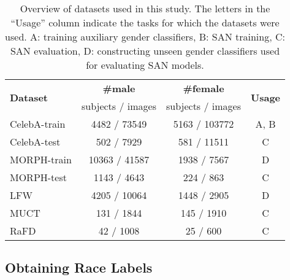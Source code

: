 \documentclass[10pt,twocolumn,letterpaper]{article}
\begin{document}
\begin{table}[h]
\begin{center}
\begin{threeparttable}
\caption{Overview of datasets used in this study. The letters in the ``Usage'' column indicate the tasks for which the datasets were used. A: training auxiliary gender classifiers, B: SAN training, C: SAN evaluation, D: constructing unseen gender classifiers used for evaluating SAN models.}
\label{tab:datasets}
\centering
\small
\begin{tabular}{ l c c c}
 \toprule
 \multirow{2}{*}{ {\bf Dataset} } & {\bf \#male}& {\bf \#female}&   \multirow{2}{*}{ {\bf Usage} } \\
& {subjects / images} & {subjects / images} & \\
\midrule
CelebA-train & 4482 / \num[group-separator={,}]{73549} & 5163 / \num[group-separator={,}]{103772} & A, B\\ 
CelebA-test & 502 / \num[group-separator={,}]{7929} & 581 / \num[group-separator={,}]{11511}  & C\\ 
MORPH-train & \num[group-separator={,}]{10363} / \num[group-separator={,}]{41587} &  1938 / \num[group-separator={,}]{7567}  & D\\ 
MORPH-test & 1143 / \num[group-separator={,}]{4643} & 224 / 863 & C\\ 
LFW & 4205 / \num[group-separator={,}]{10064} & 1448 / \num[group-separator={,}]{2905}  & D\\ 
MUCT & 131 / \num[group-separator={,}]{1844} & 145 / \num[group-separator={,}]{1910}   & C\\ 
RaFD & 42 / \num[group-separator={,}]{1008} & 25 / 600 & C\\ 
\bottomrule 
\end{tabular} %
\end{threeparttable}
\end{center}
\end{table}

\subsection{Obtaining Race Labels}
\end{document}
